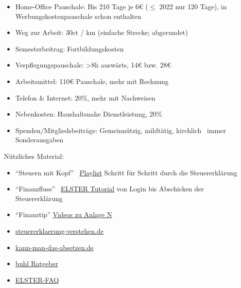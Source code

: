 \documentclass{beamer}
\begin{document}
			\begin{frame}
				\begin{itemize}
					\item Home-Office Pauschale: Bis 210 Tage je 6€ ($\leq$ 2022 nur 120 Tage), in Werbungskostenpauschale schon enthalten
					\item Weg zur Arbeit: 30ct / km (einfache Strecke; abgerundet)
					\item Semesterbeitrag: Fortbildungskosten
					\item Verpflegungspauschale: >8h auswärts, 14€ bzw. 28€
					\item Arbeitsmittel: 110€ Pauschale, mehr mit Rechnung
					\item Telefon \& Internet: 20\%, mehr mit Nachweisen
					\item Nebenkosten: Haushaltsnahe Dienstleistung, 20\%
					\item Spenden/Mitgliedsbeiträge: Gemeinnützig, mildtätig, kirchlich \textrightarrow\ immer Sonderausgaben
				\end{itemize}
			\end{frame}
		
			\begin{frame}
				Nützliches Material:\n
				\begin{itemize}
					\item "`Steuern mit Kopf"' \textrightarrow\ \href{https://www.youtube.com/watch?v=vEYL7AlCTgw&list=PL0OXhlRkvak8sq4efIvHYxx4e_DrE8zZT}{Playlist} Schritt für Schritt durch die Steuererklärung
					\item "`Finanzfluss"' \textrightarrow\ \href{https://www.youtube.com/watch?v=FiAGN-RrHMg}{ELSTER Tutorial} von Login bis Abschicken der Steuererklärung
					\item "`Finanztip"' \href{https://www.finanztip.de/steuererklaerung/steuererklaerung-anlage-n/}{Videos zu Anlage N}
					\item \href{https://www.steuererklaerung-verstehen.de/}{steuererklaerung-verstehen.de}
					\item \href{https://www.kann-man-das-absetzen.de/}{kann-man-das-absetzen.de}
					\item \href{https://www.buhl.de/steuer/ratgeber/}{buhl Ratgeber}
					\item \href{https://www.elster.de/eportal/helpGlobal?themaGlobal=help_est_ufa_10_2023}{ELSTER-FAQ}
				\end{itemize}
			\end{frame}
	
\end{document}
